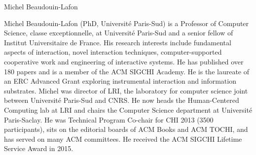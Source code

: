 \begin{participant}[type=PI,PM=2,gender=male]{Michel Beaudouin-Lafon}

Michel Beaudouin-Lafon (PhD, Université Paris-Sud) is a Professor of Computer Science, classe exceptionnelle, 
at Université Paris-Sud and a senior fellow of Institut Universitaire de France. 
His research interests include fundamental aspects of interaction, novel interaction techniques, 
computer-supported cooperative work and engineering of interactive systems. 
He has published over 180 papers and is a member of the ACM SIGCHI Academy. 
He is the laureate of an ERC Advanced Grant exploring instrumental interaction and information substrates. 
Michel was director of LRI, the laboratory for computer science joint between Université Paris-Sud and CNRS. 
He now heads the Human-Centered Computing lab at LRI and chairs the Computer Science department at Université Paris-Saclay. 
He was Technical Program Co-chair for CHI 2013 (3500 participants), sits on the editorial boards of ACM Books and ACM TOCHI, 
and has served on many ACM committees. He received the ACM SIGCHI Lifetime Service Award in 2015.

\end{participant}

